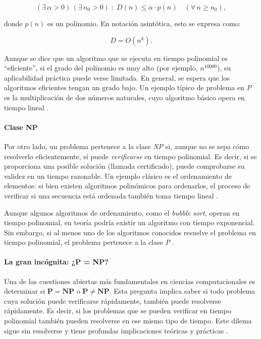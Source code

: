 \documentclass[12pt,titlepage,twoside,openright]{book}
\begin{document}
\[
	(\exists\,\alpha > 0)\,(\exists\,n_0 > 0)\;:\; D(n) \leq \alpha \cdot p(n) \quad (\forall\,n \geq n_0),
\]

donde \(p(n)\) es un polinomio. En notación asintótica, esto se expresa como:

\[
	D = O(n^k).
\]

Aunque se dice que un algoritmo que se ejecuta en tiempo polinomial es “eficiente”, si el grado del polinomio es muy alto (por ejemplo, \(n^{10000}\)), su aplicabilidad práctica puede verse limitada. En general, se espera que los algoritmos eficientes tengan un grado bajo. Un ejemplo típico de problema en \emph{P} es la multiplicación de dos números naturales, cuyo algoritmo básico opera en tiempo lineal \citep{Flores2014}.

\paragraph{Clase NP}

Por otro lado, un problema pertenece a la clase \emph{NP} si, aunque no se sepa cómo resolverlo eficientemente, sí puede \emph{verificarse} en tiempo polinomial. Es decir, si se proporciona una posible solución (llamada certificado), puede comprobarse su validez en un tiempo razonable. Un ejemplo clásico es el ordenamiento de elementos: si bien existen algoritmos polinómicos para ordenarlos, el proceso de verificar si una secuencia está ordenada también toma tiempo lineal \citep{Flores2014}.

Aunque algunos algoritmos de ordenamiento, como el \emph{bubble sort}, operan en tiempo polinomial, en teoría podría existir un algoritmo con tiempo exponencial. Sin embargo, si al menos uno de los algoritmos conocidos resuelve el problema en tiempo polinomial, el problema pertenece a la clase \emph{P} \citep{Flores2014}.

\paragraph{La gran incógnita: ¿P = NP?}

Una de las cuestiones abiertas más fundamentales en ciencias computacionales es determinar si \(\mathbf{P = NP}\) o \(\mathbf{P \neq NP}\). Esta pregunta implica saber si todo problema cuya solución puede verificarse rápidamente, también puede resolverse rápidamente. Es decir, si los problemas que se pueden verificar en tiempo polinomial también pueden resolverse en ese mismo tipo de tiempo. Este dilema sigue sin resolverse y tiene profundas implicaciones teóricas y prácticas \citep{maldonado2013problema}.
\end{document}
